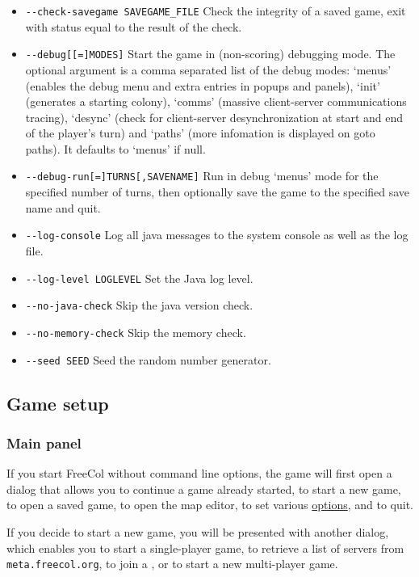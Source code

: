 \documentclass[12pt]{book}
\begin{document}
\begin{itemize}
\item\verb$--check-savegame SAVEGAME_FILE$ Check the integrity of a saved game,
  exit with status equal to the result of the check.
\item\verb$--debug[[=]MODES]$ Start the game in (non-scoring)
  debugging mode.  The optional argument is a comma separated list of
  the debug modes: `menus' (enables the debug menu and extra entries
  in popups and panels), `init' (generates a starting colony), `comms'
  (massive client-server communications tracing), `desync' (check for
  client-server desynchronization at start and end of the player's
  turn) and `paths' (more infomation is displayed on goto paths).  It
  defaults to `menus' if null.
\item\verb$--debug-run[=]TURNS[,SAVENAME]$ Run in debug `menus' mode
  for the specified number of turns, then optionally save the game to
  the specified save name and quit.
\item\verb$--log-console$ Log all java messages to the system console
  as well as the log file.
\item\verb$--log-level LOGLEVEL$ Set the Java log level.
\item\verb$--no-java-check$ Skip the java version check.
\item\verb$--no-memory-check$ Skip the memory check.
\item\verb$--seed SEED$ Seed the random number generator.
\end{itemize}


\hypertarget{Game setup}{\subsection{Game setup}}


\hypertarget{Main panel}{\subsubsection{Main panel}}

If you start FreeCol without command line options, the game will first
open a dialog that allows you to continue a game already started, to
start a new game, to open a saved game, to open the map editor, to set
various \hyperlink{client options} {options}, and to quit.

If you decide to start a new game, you will be presented with another
dialog, which enables you to start a single-player game, to retrieve a
list of servers from \verb$meta.freecol.org$,
to join a , or to start a new multi-player
game.
\end{document}
